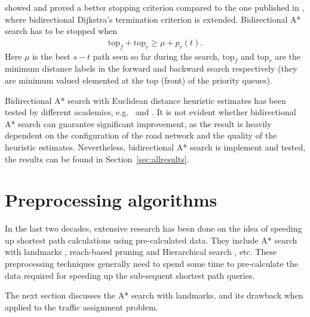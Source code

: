 \citet{GoldbergEPP} showed and proved a better stopping criterion compared to the one published in \citet{Pohl},
where bidirectional Dijkstra's termination criterion is extended.
Bidirectional A* search has to be stopped when
\begin{align}
    \text{top}_f + \text{top}_r \geq \mu + p_r(t).
\end{align}
Here $\mu$ is the best $s-t$ path seen so far during the search,
$\text{top}_f$ and $\text{top}_r$ are the minimum distance labels in the forward and backward search respectively (they are minimum valued elemented at the top (front) of the priority queues).

Bidirectional A* search with Euclidean distance heuristic estimates has been tested by different academics, e.g.\ \citet{Klunder} and \citet{Goldberg05}.
It is not evident whether bidirectional A* search can guarantee significant improvement,
as the result is heavily dependent on the configuration of the road network and the quality of the heuristic estimates.
Nevertheless, bidirectional A* search is implement and tested, the results can be found in Section~\ref{sec:allresults}.

\section{Preprocessing algorithms}
In the last two decades,
extensive research has been done on the idea of speeding up shortest path calculations using pre-calculated data.
They include A* search with landmarks \citep{GoldbergLandmarks}, reach-based pruning \citep{Goldberg} and Hierarchical search \citep{Ertl1998, Pearson}, etc.
These preprocessing techniques generally need to spend some time to pre-calculate the data required for speeding up the sub-sequent shortest path queries.

The next section discusses the A* search with landmarks,
and its drawback when applied to the traffic assignment problem.

